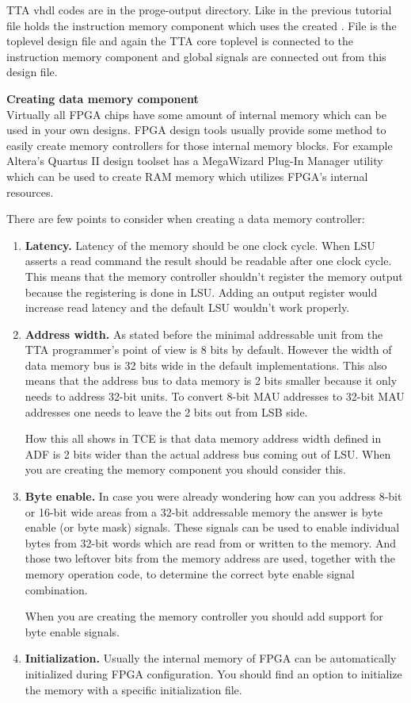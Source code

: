 \documentclass[twoside]{tceusermanual}
\begin{document}

TTA vhdl codes are in the proge-output directory. Like in the previous
tutorial file  holds the instruction memory
component which uses the created . File
 is the toplevel design file and again the
TTA core toplevel is connected to the instruction memory component and global
signals are connected out from this design file.

\textbf{Creating data memory component} \\
Virtually all FPGA chips have some amount of internal memory which can be used
in your own designs. FPGA design tools usually provide some method to easily
create memory controllers for those internal memory blocks. For example
Altera's Quartus II design toolset has a MegaWizard Plug-In Manager utility
which can be used to create RAM memory which utilizes FPGA's internal
resources.

There are few points to consider when creating a data memory controller:
\begin{enumerate}
 \item%
 \textbf{Latency.} Latency of the memory should be one clock cycle. When LSU 
 asserts a read command the result should be readable after one clock
 cycle. This means that the memory controller shouldn't register the memory
 output because the registering is done in LSU. Adding an output register
 would increase read latency and the default LSU wouldn't work properly.
\item%
 \textbf{Address width.}
 As stated before the minimal addressable unit from the TTA programmer's point
 of view is 8 bits by default. However the width of data memory bus is 32 bits
 wide in the default implementations. This also means that the address bus to
 data memory is 2 bits smaller because it only needs to address 32-bit units.
 To convert 8-bit MAU addresses to 32-bit MAU addresses one needs to leave the
 2 bits out from LSB side.

 How this all shows in TCE is that data memory address width defined in ADF is
 2 bits wider than the actual address bus coming out of LSU. When you are
 creating the memory component you should consider this.
\item%
 \textbf{Byte enable.}
 In case you were already wondering how can you address 8-bit or 16-bit wide
 areas from a 32-bit addressable memory the answer is byte enable (or byte
 mask) signals. These signals can be used to enable individual bytes from
 32-bit words which are read from or written to the memory. And those two
 leftover bits from the memory address are used, together with the memory
 operation code, to determine the correct byte enable signal combination.

 When you are creating the memory controller you should add support for byte
 enable signals.
\item%
 \textbf{Initialization.}
 Usually the internal memory of FPGA can be automatically initialized during
 FPGA configuration. You should find an option to initialize the memory with
 a specific initialization file.
\end{enumerate}
\end{document}
